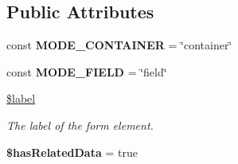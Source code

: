\subsection*{Public Attributes}
\begin{DoxyCompactItemize}
\item 
\hypertarget{class_multi_elements_a5cbd4682387a95316060c95d684a871e}{
const {\bfseries MODE\_\-CONTAINER} = \char`\"{}container\char`\"{}}
\label{class_multi_elements_a5cbd4682387a95316060c95d684a871e}

\item 
\hypertarget{class_multi_elements_a6715b40e298eeaf32ce752f5b607c202}{
const {\bfseries MODE\_\-FIELD} = \char`\"{}field\char`\"{}}
\label{class_multi_elements_a6715b40e298eeaf32ce752f5b607c202}

\item 
\hypertarget{class_multi_elements_a114619f284c51683d14a1b0e03544a27}{
\hyperlink{class_multi_elements_a114619f284c51683d14a1b0e03544a27}{\$label}}
\label{class_multi_elements_a114619f284c51683d14a1b0e03544a27}

\begin{DoxyCompactList}\small\item\em The label of the form element. \item\end{DoxyCompactList}\item 
\hypertarget{class_multi_elements_a378d8633d92d9c7a3d1a6bdaf5e64f1a}{
{\bfseries \$hasRelatedData} = true}
\label{class_multi_elements_a378d8633d92d9c7a3d1a6bdaf5e64f1a}

\end{DoxyCompactItemize}
